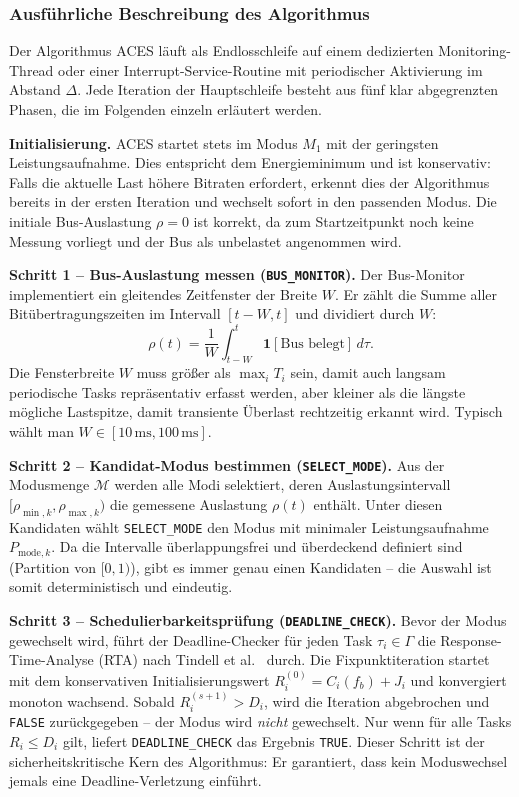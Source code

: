 ﻿\documentclass[a4paper,12pt]{article}
\theoremstyle{definition}
\begin{document}
\subsubsection{Ausf\"{u}hrliche Beschreibung des Algorithmus}

Der Algorithmus ACES l\"{a}uft als Endlosschleife auf einem dedizierten
Monitoring-Thread oder einer Interrupt-Service-Routine mit periodischer Aktivierung
im Abstand $\Delta$.
Jede Iteration der Hauptschleife besteht aus f\"{u}nf klar abgegrenzten Phasen,
die im Folgenden einzeln erl\"{a}utert werden.

\textbf{Initialisierung.}
ACES startet stets im Modus $M_1$ mit der geringsten Leistungsaufnahme.
Dies entspricht dem Energieminimum und ist konservativ: Falls die aktuelle Last
h\"{o}here Bitraten erfordert, erkennt dies der Algorithmus bereits in der ersten
Iteration und wechselt sofort in den passenden Modus.
Die initiale Bus-Auslastung $\rho = 0$ ist korrekt, da zum Startzeitpunkt noch
keine Messung vorliegt und der Bus als unbelastet angenommen wird.

\textbf{Schritt 1 -- Bus-Auslastung messen (\texttt{BUS\_MONITOR}).}
Der Bus-Monitor implementiert ein gleitendes Zeitfenster der Breite $W$.
Er z\"{a}hlt die Summe aller Bit\"{u}bertragungszeiten im Intervall $[t - W, t]$ und
dividiert durch $W$:
\[
    \rho(t) = \frac{1}{W} \int_{t-W}^{t} \mathbf{1}[\text{Bus belegt}]\, d\tau.
\]
Die Fensterbreite $W$ muss gr\"{o}\ss{}er als $\max_i T_i$ sein, damit auch langsam
periodische Tasks repr\"{a}sentativ erfasst werden, aber kleiner als die l\"{a}ngste
m\"{o}gliche Lastspitze, damit transiente \"{U}berlast rechtzeitig erkannt wird.
Typisch w\"{a}hlt man $W \in [10\,\text{ms}, 100\,\text{ms}]$.

\textbf{Schritt 2 -- Kandidat-Modus bestimmen (\texttt{SELECT\_MODE}).}
Aus der Modusmenge $\mathcal{M}$ werden alle Modi selektiert, deren
Auslastungsintervall $[\rho_{\min,k}, \rho_{\max,k})$ die gemessene Auslastung
$\rho(t)$ enth\"{a}lt.
Unter diesen Kandidaten w\"{a}hlt \texttt{SELECT\_MODE} den Modus mit minimaler
Leistungsaufnahme $P_{\mathrm{mode},k}$.
Da die Intervalle \"{u}berlappungsfrei und \"{u}berdeckend definiert sind
(Partition von $[0, 1)$), gibt es immer genau einen Kandidaten -- die Auswahl ist
somit deterministisch und eindeutig.

\textbf{Schritt 3 -- Schedulierbarkeitspr\"{u}fung (\texttt{DEADLINE\_CHECK}).}
Bevor der Modus gewechselt wird, f\"{u}hrt der Deadline-Checker f\"{u}r jeden Task
$\tau_i \in \Gamma$ die Response-Time-Analyse (RTA) nach Tindell et al.~\cite{tindell_can}
durch.
Die Fixpunktiteration startet mit dem konservativen Initialisierungswert
$R_i^{(0)} = C_i(f_b) + J_i$ und konvergiert monoton wachsend.
Sobald $R_i^{(s+1)} > D_i$, wird die Iteration abgebrochen und \texttt{FALSE}
zur\"{u}ckgegeben -- der Modus wird \emph{nicht} gewechselt.
Nur wenn f\"{u}r alle Tasks $R_i \leq D_i$ gilt, liefert \texttt{DEADLINE\_CHECK}
das Ergebnis \texttt{TRUE}.
Dieser Schritt ist der sicherheitskritische Kern des Algorithmus: Er garantiert,
dass kein Moduswechsel jemals eine Deadline-Verletzung einf\"{u}hrt.
\end{document}
